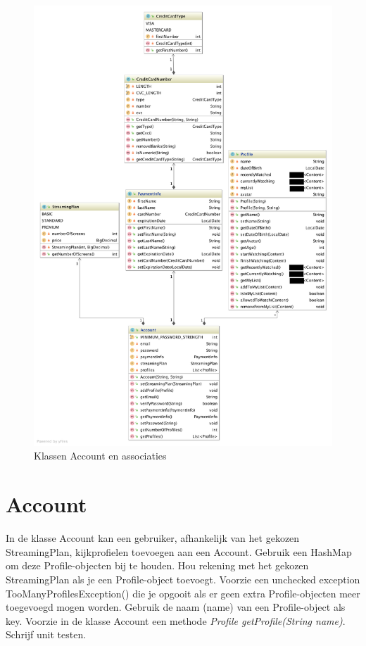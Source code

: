 \documentclass{tstextbook}
\begin{document}
\begin{figure}[H]
  \includegraphics[height=\textheight]{images/diagrams/account_hierarchy.png}
  \caption{Klassen Account en associaties}
  \label{fig:content_hierarchy}
\end{figure}

\section{Account}
In de klasse Account kan een gebruiker, afhankelijk van het gekozen StreamingPlan, kijkprofielen toevoegen aan een Account. Gebruik een HashMap om deze Profile-objecten bij te houden. Hou rekening met het gekozen StreamingPlan als je een Profile-object toevoegt. Voorzie een unchecked exception TooManyProfilesException() die je opgooit als er geen extra Profile-objecten meer toegevoegd mogen worden. Gebruik de naam (name) van een Profile-object als key. Voorzie in de klasse Account een methode \textit{Profile getProfile(String name)}. Schrijf unit testen.
\end{document}
